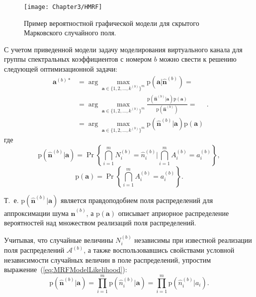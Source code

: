 \begin{figure}[htbp]
  \centering
  \texttt{[image: Chapter3/HMRF]}
  \caption{Пример вероятностной графической модели для скрытого Марковского случайного поля.}
  \label{fig:chap3:HMRF}
\end{figure}

С учетом приведенной модели задачу моделирования виртуального канала для группы спектральных коэффициентов с номером $b$ можно свести к решению следующей оптимизационной задачи:
\begin{equation}
\begin{split}
\mathbf{a}^{(b)*}
& = \arg\max_{\mathbf{a} \in \{1,2,\ldots,k^{(b)}\}^m} \mathrm{p}(\mathbf{a} \vert \hat{\mathbf{n}}^{(b)} ) = \\
& = \arg\max_{\mathbf{a} \in \{1,2,\ldots,k^{(b)}\}^m}
\frac{\mathrm{p}(\hat{\mathbf{n}}^{(b)} \vert \mathbf{a})\mathrm{p}(\mathbf{a})}{\mathrm{p}(\hat{\mathbf{n}}^{(b)})} = \\
& = \arg\max_{\mathbf{a} \in \{1,2,\ldots,k^{(b)}\}^m}
\mathrm{p}(\hat{\mathbf{n}}^{(b)} \vert \mathbf{a})\mathrm{p}(\mathbf{a})
\end{split}.
\label{eq:MRFOptimization}
\end{equation}
где
\begin{equation}
\mathrm{p}(\hat{\mathbf{n}}^{(b)} \vert \mathbf{a}) = \Pr \left\lbrace \bigcap\limits_{i=1}^{m} N_i^{(b)} = \hat{n}_i^{(b)} \bigg\vert \bigcap\limits_{i=1}^{m} A_i^{(b)} = a_i^{(b)} \right\rbrace,
\label{eq:MRFModelLikelihood}
\end{equation}
\begin{equation}
\mathrm{p}(\mathbf{a}) = \Pr \left\lbrace \bigcap\limits_{i=1}^{m} A_i^{(b)} = a_i^{(b)} \right\rbrace.
\end{equation}

Т.~е. $\mathrm{p}(\hat{\mathbf{n}}^{(b)} \vert \mathbf{a})$ является правдоподобием поля распределений для аппроксимации шума $\hat{\mathbf{n}}^{(b)}$, а $\mathrm{p}(\mathbf{a})$ описывает априорное распределение вероятностей над множеством реализаций поля распределений.

Учитывая, что случайные величины $N_i^{(b)}$ независимы при известной реализации поля распределений $\mathcal{A}^{(b)}$, а также воспользовавшись свойствами условной независимости случайных величин в поле распределений, упростим выражение~(\ref{eq:MRFModelLikelihood}):
\begin{equation}
\mathrm{p}(\hat{\mathbf{n}}^{(b)} \vert \mathbf{a}) = \prod\limits_{i=1}^{m} \mathrm{p} (\hat{n}_i^{(b)} \vert \mathbf{a}) = \prod\limits_{i=1}^{m}\mathrm{p} (\hat{n}_i^{(b)} \vert a_i).
\end{equation}

